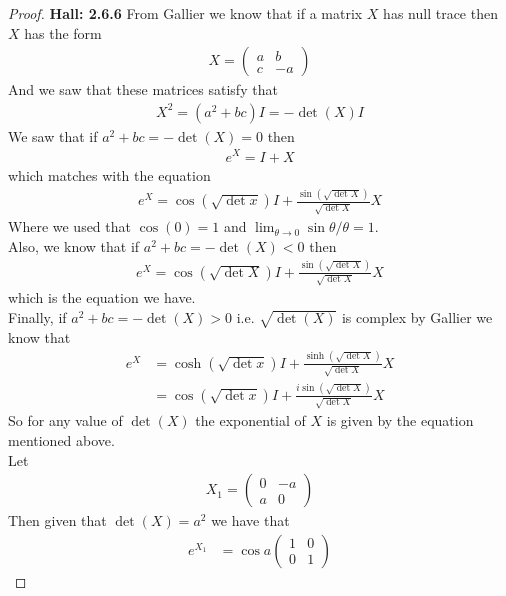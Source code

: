 \documentclass[11pt]{article}
\theoremstyle{definition}
\begin{document}
\begin{proof}{\textbf{Hall: 2.6.6}}
    From Gallier we know that if a matrix $X$ has null trace then $X$ has the
    form
    \begin{align*}
        X = \begin{pmatrix}a & b \\ c & -a\end{pmatrix}
    \end{align*}
    And we saw that these matrices satisfy that
    \begin{align*}
        X^2 = (a^2 + bc)I = -\det(X)I
    \end{align*}
    We saw that if $a^2 + bc = -\det(X) = 0$ then
    \begin{align*}
        e^X = I + X
    \end{align*}
    which matches with the equation
    \begin{align*}
        e^X = \cos(\sqrt{\det{x}})I + \frac{\sin(\sqrt{\det{X}})}{\sqrt{\det{X}}}X
    \end{align*}
    Where we used that $\cos(0) = 1$ and $\lim_{\theta \to 0} \sin\theta/\theta = 1$.\\
    Also, we know that if $a^2 + bc = -\det(X) < 0$ then
    \begin{align*}
        e^X = \cos(\sqrt{\det{X}})I + \frac{\sin(\sqrt{\det{X}})}{\sqrt{\det{X}}}X
    \end{align*}
    which is the equation we have.\\
    Finally, if $a^2 + bc = -\det(X) > 0$ i.e. $\sqrt{\det(X)}$ is complex by
    Gallier we know that
    \begin{align*}
        e^X &= \cosh(\sqrt{\det{x}})I + \frac{\sinh(\sqrt{\det{X}})}{\sqrt{\det{X}}}X\\
        &= \cos(\sqrt{\det{x}})I + \frac{i\sin(\sqrt{\det{X}})}{\sqrt{\det{X}}}X
    \end{align*}
    So for any value of $\det(X)$ the exponential of $X$ is given by the
    equation mentioned above.\\
    Let
    \begin{align*}
        X_1 = \begin{pmatrix}0 & -a\\ a & 0\end{pmatrix}
    \end{align*}
    Then given that $\det(X) = a^2$ we have that
    \begin{align*}
    e^{X_1} &= \cos a\begin{pmatrix}1 & 0\\ 0 & 1\end{pmatrix}

\end{align*}
\end{proof}
\end{document}
